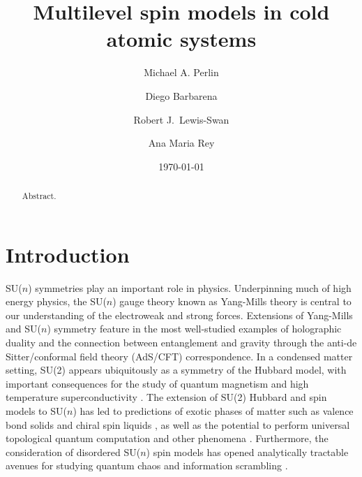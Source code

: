 \documentclass[nofootinbib,twocolumn]{revtex4-2}
\newcommand{\1}{\mathds{1}}
\begin{document}

\title{Multilevel spin models in cold atomic systems}
\author{Michael A. Perlin}
\author{Diego Barbarena}
\author{Robert J.~Lewis-Swan}
\author{Ana Maria Rey}

\date{\today}

\begin{abstract}
  Abstract.
\end{abstract}

\maketitle

\section{Introduction}
\label{sec:intro}

SU($n$) symmetries play an important role in physics.
Underpinning much of high energy physics, the SU($n$) gauge theory known as Yang-Mills theory is central to our understanding of the electroweak and strong forces.
Extensions of Yang-Mills and SU($n$) symmetry feature in the most well-studied examples of holographic duality \cite{maldacena1999largen} and the connection between entanglement and gravity \cite{ryu2006holographic} through the anti-de Sitter/conformal field theory (AdS/CFT) correspondence.
In a condensed matter setting, SU(2) appears ubiquitously as a symmetry of the Hubbard model, with important consequences for the study of quantum magnetism and high temperature superconductivity \cite{lee2006doping}.
The extension of SU(2) Hubbard and spin models to SU($n$) has led to predictions of exotic phases of matter such as valence bond solids \cite{read1989valencebond, rokhsar1990quadratic, kaul2012lattice, hermele2011topological} and chiral spin liquids \cite{hermele2009mott, hermele2011topological, chen2016syntheticgaugefield, nataf2016chiral}, as well as the potential to perform universal topological quantum computation \cite{freedman2004class, nayak2008nonabelian} and other phenomena \cite{nataf2014exact, nataf2016exact}.
Furthermore, the consideration of disordered SU($n$) spin models has opened analytically tractable avenues for studying quantum chaos and information scrambling \cite{sachdev1993gapless, bentsen2019integrable}.
\end{document}

